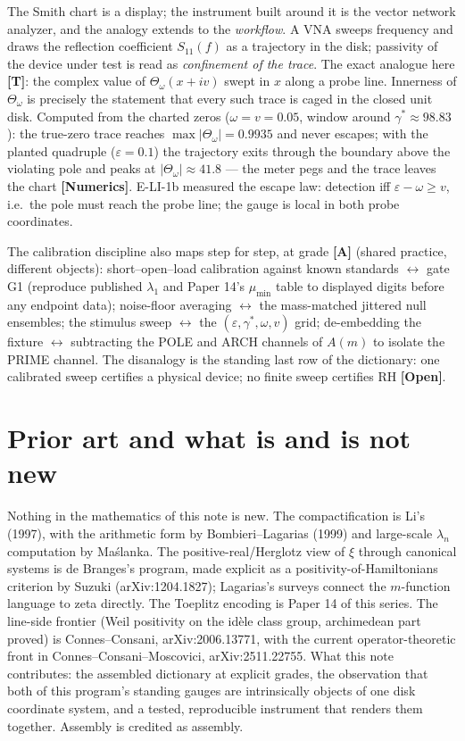 \documentclass[11pt]{article}
\theoremstyle{remark}
\newcommand{\gr}[1]{\textbf{[#1]}} %
\begin{document}
The Smith chart is a display; the instrument built around it is the vector network
analyzer, and the analogy extends to the \emph{workflow}. A VNA sweeps frequency and draws
the reflection coefficient $S_{11}(f)$ as a trajectory in the disk; passivity of the device
under test is read as \emph{confinement of the trace}. The exact analogue here \gr{T}: the
complex value of $\Theta_\omega(x+iv)$ swept in $x$ along a probe line. Innerness of
$\Theta_\omega$ is precisely the statement that every such trace is caged in the closed
unit disk. Computed from the charted zeros ($\omega=v=0.05$, window around
$\gamma^*\approx98.83$): the true-zero trace reaches $\max|\Theta_\omega|=0.9935$ and never
escapes; with the planted quadruple ($\varepsilon=0.1$) the trajectory exits through the
boundary above the violating pole and peaks at $|\Theta_\omega|\approx41.8$ --- the meter
pegs and the trace leaves the chart \gr{Numerics}. E-LI-1b measured the escape law:
detection iff $\varepsilon-\omega\ge v$, i.e.\ the pole must reach the probe line; the
gauge is local in both probe coordinates.

The calibration discipline also maps step for step, at grade \gr{A} (shared practice,
different objects): short--open--load calibration against known standards $\leftrightarrow$
gate G1 (reproduce published $\lambda_1$ and Paper 14's $\mu_{\min}$ table to displayed
digits before any endpoint data); noise-floor averaging $\leftrightarrow$ the mass-matched
jittered null ensembles; the stimulus sweep $\leftrightarrow$ the
$(\varepsilon,\gamma^*,\omega,v)$ grid; de-embedding the fixture $\leftrightarrow$
subtracting the POLE and ARCH channels of $A(m)$ to isolate the PRIME channel. The
disanalogy is the standing last row of the dictionary: one calibrated sweep certifies a
physical device; no finite sweep certifies RH \gr{Open}.

\section{Prior art and what is and is not new}

Nothing in the mathematics of this note is new. The compactification is Li's (1997), with
the arithmetic form by Bombieri--Lagarias (1999) and large-scale $\lambda_n$ computation by
Ma\'slanka. The positive-real/Herglotz view of $\xi$ through canonical systems is de
Branges's program, made explicit as a positivity-of-Hamiltonians criterion by Suzuki
(arXiv:1204.1827); Lagarias's surveys connect the $m$-function language to zeta directly.
The Toeplitz encoding is Paper 14 of this series. The line-side frontier (Weil positivity on
the id\`ele class group, archimedean part proved) is Connes--Consani, arXiv:2006.13771, with
the current operator-theoretic front in Connes--Consani--Moscovici, arXiv:2511.22755. What
this note contributes: the assembled dictionary at explicit grades, the observation that
both of this program's standing gauges are intrinsically objects of one disk coordinate
system, and a tested, reproducible instrument that renders them together. Assembly is
credited as assembly.
\end{document}
